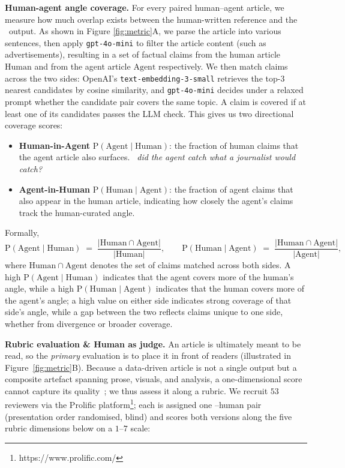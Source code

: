 \textbf{Human-agent angle coverage.}
For every paired human--agent article, we measure how much overlap exists between the human-written reference and the \method\ output. As shown in Figure \ref{fig:metric}A, we parse the article into various sentences, then apply \texttt{gpt-4o-mini} to filter the article content (such as advertisements), resulting in a set of factual claims from the human article $\mathrm{Human}$ and from the agent article $\mathrm{Agent}$ respectively.
We then match claims across the two sides: OpenAI's \texttt{text-embedding-3-small} retrieves the top-3 nearest candidates by cosine similarity, and \texttt{gpt-4o-mini} decides under a relaxed prompt whether the candidate pair covers the same topic. A claim is covered if at least one of its candidates passes the LLM check. This gives us two directional coverage scores:
\begin{itemize}
    \item \textbf{Human-in-Agent} $\mathrm{P}(\mathrm{Agent} \mid \mathrm{Human})$: the fraction of human claims that the agent article also surfaces. \textit{\ie~did the agent catch what a journalist would catch?}
    \item \textbf{Agent-in-Human} $\mathrm{P}(\mathrm{Human} \mid \mathrm{Agent})$: the fraction of agent claims that also appear in the human article, indicating how closely the agent's claims track the human-curated angle.
\end{itemize}
Formally,
\[
\mathrm{P}(\mathrm{Agent} \mid \mathrm{Human}) \;=\; \frac{|\mathrm{Human} \cap \mathrm{Agent}|}{|\mathrm{Human}|}, \qquad
\mathrm{P}(\mathrm{Human} \mid \mathrm{Agent}) \;=\; \frac{|\mathrm{Human} \cap \mathrm{Agent}|}{|\mathrm{Agent}|},
\]
where $\mathrm{Human} \cap \mathrm{Agent}$ denotes the set of claims matched across both sides. A high $\mathrm{P}(\mathrm{Agent} \mid \mathrm{Human})$ indicates that the agent covers more of the human's angle, while a high $\mathrm{P}(\mathrm{Human} \mid \mathrm{Agent})$ indicates that the human covers more of the agent's angle;
a high value on either side indicates strong coverage of that side's angle, while a gap between the two reflects claims unique to one side, whether from divergence or broader coverage.

\textbf{Rubric evaluation \& Human as judge.}
An article is ultimately meant to be read, so the \textit{primary} evaluation is to place it in front of readers (illustrated in Figure~\ref{fig:metric}B). 
Because a data-driven article is not a single output but a composite artefact spanning prose, visuals, and analysis, a one-dimensional score cannot capture its quality~\cite{handbook,datajournalism}; we thus assess it along a rubric. We recruit $53$ reviewers via the Prolific platform\footnote{https://www.prolific.com/}; each is assigned one \methodshort{}--human pair (presentation order randomised, blind) and scores both versions along the five rubric dimensions below on a $1$--$7$ scale:

